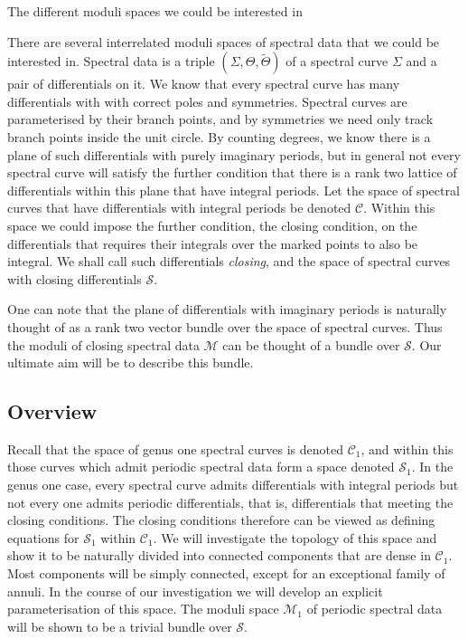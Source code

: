 The different moduli spaces we could be interested in

There are several interrelated moduli spaces of spectral data that we could be interested in. Spectral data is a triple $(Σ,Θ,\tilde{Θ})$ of a spectral curve $Σ$ and a pair of differentials on it. We know that every spectral curve has many differentials with with correct poles and symmetries. Spectral curves are parameterised by their branch points, and by symmetries we need only track branch points inside the unit circle. By counting degrees, we know there is a plane of such differentials with purely imaginary periods, but in general not every spectral curve will satisfy the further condition that there is a rank two lattice of differentials within this plane that have integral periods. Let the space of spectral curves that have differentials with integral periods be denoted $\mathcal{C}$. Within this space we could impose the further condition, the closing condition, on the differentials that requires their integrals over the marked points to also be integral. We shall call such differentials \emph{closing}, and the space of spectral curves with closing differentials $\mathcal{S}$.

One can note that the plane of differentials with imaginary periods is naturally thought of as a rank two vector bundle over the space of spectral curves. Thus the moduli of closing spectral data $\mathcal{M}$ can be thought of a bundle over $\mathcal{S}$. Our ultimate aim will be to describe this bundle.










\subsection{Overview}
\label{sub:Overview}

Recall that the space of genus one spectral curves is denoted $\mathcal{C}_1$, and within this those curves which admit periodic spectral data form a space denoted $\mathcal{S}_1$. In the genus one case, every spectral curve admits differentials with integral periods but not every one admits periodic differentials, that is, differentials that meeting the closing conditions. The closing conditions therefore can be viewed as defining equations for $\mathcal{S}_1$ within $\mathcal{C}_1$. We will investigate the topology of this space and show it to be naturally divided into connected components that are dense in $\mathcal{C}_1$. Most components will be simply connected, except for an exceptional family of annuli. In the course of our investigation we will develop an explicit parameterisation of this space. The moduli space $\mathcal{M}_1$ of periodic spectral data will be shown to be a trivial bundle over $\mathcal{S}$.

